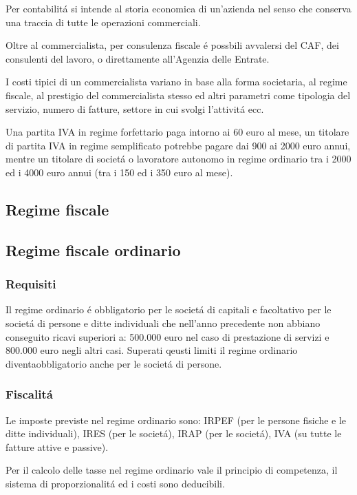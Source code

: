 \documentclass{article}
\begin{document}
Per contabilit\'a si intende al storia economica di un'azienda nel senso che conserva una traccia di tutte le operazioni commerciali.

Oltre al commercialista, per consulenza fiscale \'e possbili avvalersi del CAF, dei consulenti del lavoro, o direttamente all'Agenzia delle Entrate.

I costi tipici di un commercialista variano in base alla forma societaria, al regime fiscale, al prestigio del commercialista stesso ed altri parametri come tipologia del servizio, numero di fatture, settore in cui svolgi l'attivit\'a ecc.

Una partita IVA in regime forfettario paga intorno ai 60 euro al mese,
un titolare di partita IVA in regime semplificato potrebbe pagare dai 900 ai 2000 euro annui, mentre
un titolare di societ\'a o lavoratore autonomo in regime ordinario tra i 2000 ed i 4000 euro annui (tra i 150 ed i 350 euro al mese).

\subsection{Regime fiscale}

\subsection{Regime fiscale ordinario}
\subsubsection{Requisiti}
Il regime ordinario \'e obbligatorio per le societ\'a di capitali e 
facoltativo per le societ\'a di persone e ditte individuali che nell'anno precedente non abbiano conseguito ricavi superiori a: 
500.000 euro nel caso di prestazione di servizi e 800.000 euro negli altri casi. Superati qeusti limiti il regime ordinario diventaobbligatorio anche per le societ\'a di persone.

\subsubsection{Fiscalit\'a}
Le imposte previste nel regime ordinario sono: IRPEF (per le persone fisiche e le ditte individuali), 
IRES (per le societ\'a), IRAP (per le societ\'a), IVA (su tutte le fatture attive e passive).

Per il calcolo delle tasse nel regime ordinario vale il principio di competenza, il sistema di proporzionalit\'a ed i costi sono deducibili.
\end{document}
